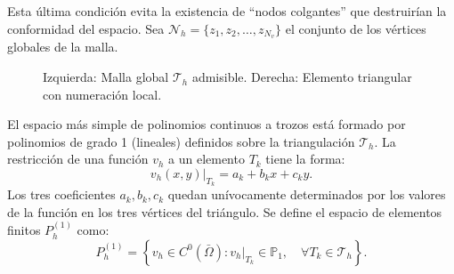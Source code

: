 \documentclass[12pt, letterpaper]{report}
\theoremstyle{definition}
\begin{document}
Esta última condición evita la existencia de ``nodos colgantes'' que destruirían la conformidad del espacio. Sea $\mathcal{N}_h = \{ z_1, z_2, \ldots, z_{N_{v}} \}$ el conjunto de los vértices globales de la malla.

\begin{figure}[h!]
    \centering
    \hspace{1cm}
    \caption{Izquierda: Malla global $\mathcal{T}_h$ admisible. Derecha: Elemento triangular con numeración local.}
    \label{fig:malla-y-triangulo}
\end{figure}

El espacio más simple de polinomios continuos a trozos está formado por polinomios de grado 1 (lineales) definidos sobre la triangulación $\mathcal{T}_h$. La restricción de una función $v_h$ a un elemento $T_k$ tiene la forma:
\[
v_h(x,y)|_{T_k} = a_k + b_k x + c_k y.
\]
Los tres coeficientes $a_k, b_k, c_k$ quedan unívocamente determinados por los valores de la función en los tres vértices del triángulo. Se define el espacio de elementos finitos $P_h^{(1)}$ como:
\[
P_h^{(1)} = \left\{ v_h \in C^0(\bar{\Omega}) : v_h|_{T_k} \in \mathbb{P}_1, \quad \forall T_k \in \mathcal{T}_h \right\}.
\]
\end{document}
